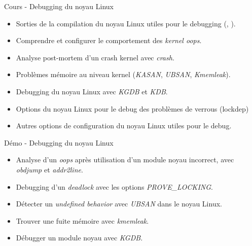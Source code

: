 \documentclass[a4paper,12pt,obeyspaces,spaces,hyphens]{article}
\begin{document}
\feagendatwocolumn
{Cours - Debugging du noyau Linux}
{
  \begin{itemize}
  \item Sorties de la compilation du noyau Linux utiles pour le
    debugging (, ).
  \item Comprendre et configurer le comportement des {\em kernel oops}.
  \item Analyse post-mortem d'un crash kernel avec {\em crash}.
  \item Problèmes mémoire au niveau kernel ({\em KASAN}, {\em UBSAN}, {\em Kmemleak}).
  \item Debugging du noyau Linux avec {\em KGDB} et {\em KDB}.
  \item Options du noyau Linux pour le debug des problèmes de verrous
    (lockdep)
  \item Autres options de configuration du noyau Linux utiles pour le
    debug.
  \end{itemize}
}
{Démo - Debugging du noyau Linux}
{
  \begin{itemize}
  \item Analyse d'un {\em oops} après utilisation d'un module noyau
    incorrect, avec {\em obdjump} et {\em addr2line}.
  \item Debugging d'un {\em deadlock} avec les options {\em PROVE\_LOCKING}.
  \item Détecter un {\em undefined behavior} avec {\em UBSAN} dans le noyau Linux.
  \item Trouver une fuite mémoire avec {\em kmemleak}.
  \item Débugger un module noyau avec {\em KGDB}.
  \end{itemize}
}
\end{document}

